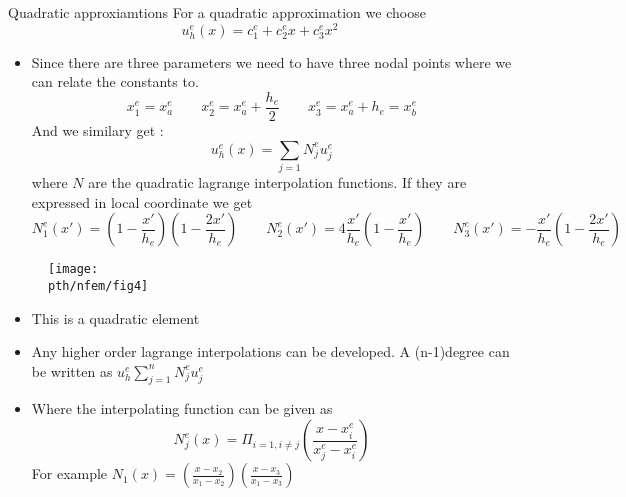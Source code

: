 	\begin{frame}{Quadratic approxiamtions}
		For a quadratic approximation we choose
		\begin{equation}
			u_h^e(x) =  c_1^e + c_2^ex + c_3^ex^2
		\end{equation}
		\begin{itemize}
			\item Since there are three parameters we need to have three nodal points where we can relate the constants to. 
			\begin{equation}
				x_1^e =  x_a^e \qquad x_2^e =  x_a^e + \frac{h_e}{2} \qquad x_3^e = x_a^e + h_e = x_b^e
			\end{equation}
			And we similary get :
			\begin{equation}
				u_h^e(x) = \sum_{j=1} N^e_ju_j^e
			\end{equation}
			where $N$ are the quadratic lagrange interpolation functions. If they are expressed in local coordinate we get
			\begin{equation}
				N_1^e(x') = \left(1-\frac{x'}{h_e} \right)\left(1-\frac{2x'}{h_e} \right) \qquad N_2^e(x') =4\frac{x'}{h_e}\left(1-\frac{x'}{h_e} \right) \qquad N_3^e(x') = -\frac{x'}{h_e}\left(1-\frac{2x'}{h_e} \right) 
			\end{equation}
		\end{itemize}
	\end{frame}

	\begin{frame}
		\begin{figure}
			\centering
			\texttt{[image: \\pth/nfem/fig4]} 
		\end{figure}
		\begin{itemize}
			\item This is a quadratic element
			\item Any higher order lagrange interpolations can be developed. A (n-1)degree can be written as $u_h^e \sum_{j=1}^{n} N_j^eu_j^e$
			\item Where the interpolating function can be given as
			\begin{equation}
				N_j^e(x) = { \Pi_{i=1,i\neq j}} \left( \frac{x-x_i^e}{x_j^e-x_i^e} \right)
			\end{equation}
			For example $N_1(x) = \left(\frac{x-x_2}{x_1-x_2} \right)\left(\frac{x-x_3}{x_1-x_3} \right)$
		\end{itemize}
	\end{frame}


